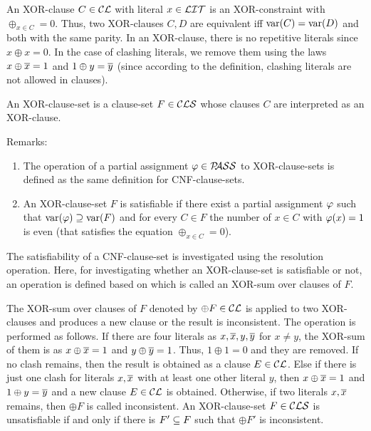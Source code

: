 \documentclass{report}
\begin{document}
\begin{defi}\label{def:xor-cls}
An XOR-clause $C \in \mathcal{CL}$ with literal $x \in \mathcal{LIT}$ is an XOR-constraint with $\oplus_{x \in C} = 0$. Thus, two XOR-clauses $C, D$ are equivalent iff $\operatorname{var}(C) = \operatorname{var}(D)$ and both with the same parity. In an XOR-clause, there is no repetitive literals since $x \oplus x = 0$. In the case of clashing literals, we remove them using the laws $x \oplus \overline{x} = 1$ and $1 \oplus y = \overline{y}$ (since according to the definition, clashing literals are not allowed in clauses).

An XOR-clause-set is a clause-set $F \in \mathcal{CLS}$ whose clauses $C$ are interpreted as an XOR-clause.  
\end{defi} 

Remarks:
\begin{enumerate}
  \item The operation of a partial assignment $\varphi \in \mathcal{P\hspace{-0.32em}ASS}$ to XOR-clause-sets is defined as the same definition for CNF-clause-sets.
  \item An XOR-clause-set $F$ is satisfiable if there exist a partial assignment $\varphi$ such that $\operatorname{var}(\varphi) \supseteq \operatorname{var}(F)$ and for every $C \in F$ the number of $x \in C$ with $\varphi(x) = 1$ is even (that satisfies the equation  $\oplus_{x \in C} = 0$).
\end{enumerate}

The satisfiability of a CNF-clause-set is investigated using the resolution operation. Here, for investigating whether an XOR-clause-set is satisfiable or not, an operation is defined based on \cite{h8,h23} which is called an XOR-sum over clauses of $F$.

\begin{defi}\label{def:xor-sum}
\cite{h8} The XOR-sum over clauses of $F$ denoted by $\oplus F \in \mathcal{CL}$ is applied to two XOR-clauses and produces a new clause or the result is inconsistent. The operation is performed as follows. If there are four literals as $x,\overline{x},y,\overline{y}$ for $x \ne y$, the XOR-sum of them is as $x \oplus \overline{x} = 1$ and $y \oplus \overline{y} = 1$. Thus, $1 \oplus 1 = 0$ and they are removed. If no clash remains, then the result is obtained as a clause $E \in \mathcal{CL}$. Else if there is just one clash for literals $x, \overline{x}$ with at least one other literal $y$, then $x \oplus \overline{x} = 1$ and $1 \oplus y=\overline{y}$ and a new clause $E \in \mathcal{CL}$ is obtained. Otherwise, if two literals $x, \overline{x}$ remains, then $\oplus F$ is called inconsistent. An XOR-clause-set $F \in \mathcal{CLS}$ is unsatisfiable if and only if there is $F' \subseteq F$ such that $\oplus F'$ is inconsistent.
\end{defi} 
\end{document}
